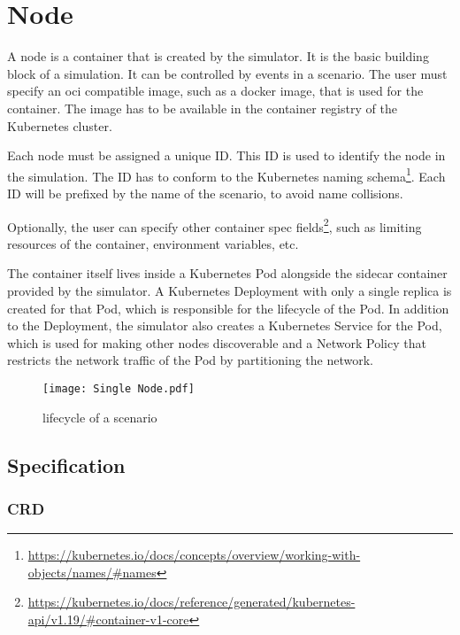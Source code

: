 \section{Node}

A node is a container that is created by the simulator. It is the basic building block of a simulation. It can be controlled by events in a scenario. The user must specify an \ac{oci} compatible image, such as a docker image, that is used for the container. The image has to be available in the container registry of the Kubernetes cluster.

Each node must be assigned a unique ID. This ID is used to identify the node in the simulation. The ID has to conform to the Kubernetes naming schema\footnote{\url{https://kubernetes.io/docs/concepts/overview/working-with-objects/names/\#names}}. Each ID will be prefixed by the name of the scenario, to avoid name collisions.

Optionally, the user can specify other container spec fields\footnote{\url{https://kubernetes.io/docs/reference/generated/kubernetes-api/v1.19/\#container-v1-core}}, such as limiting resources of the container, environment variables, etc.

The container itself lives inside a Kubernetes Pod alongside the sidecar container provided by the simulator.
A Kubernetes Deployment with only a single replica is created for that Pod, which is responsible for the lifecycle of the Pod.
In addition to the Deployment, the simulator also creates a Kubernetes Service for the Pod, which is used for making other nodes discoverable and a Network Policy that restricts the network traffic of the Pod by partitioning the network.

\begin{figure}[H]
  \label{fig:node-overview}
  \caption{lifecycle of a scenario}
  \centering
  \texttt{[image: Single Node.pdf]}
\end{figure}

\subsection{Specification}


\subsubsection{CRD}

